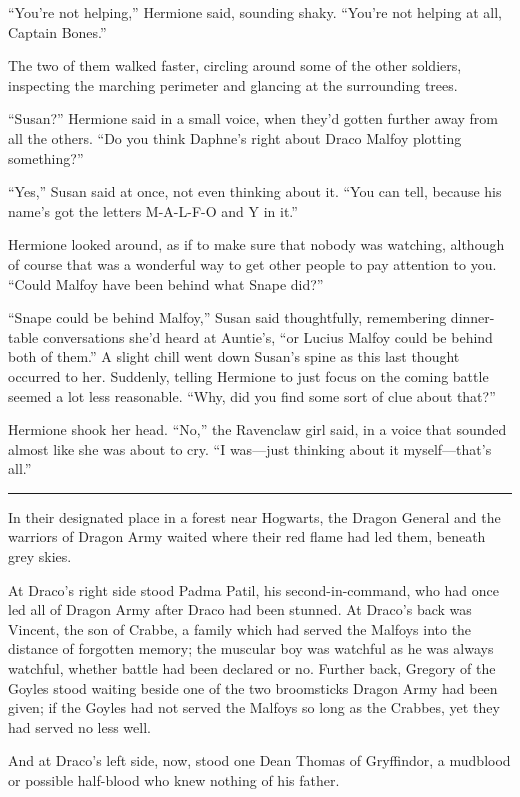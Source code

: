 ``You're not helping,'' Hermione said, sounding shaky. ``You're not
helping at all, Captain Bones.''

The two of them walked faster, circling around some of the other
soldiers, inspecting the marching perimeter and glancing at the
surrounding trees.

``Susan?'' Hermione said in a small voice, when they'd gotten further
away from all the others. ``Do you think Daphne's right about Draco
Malfoy plotting something?''

``Yes,'' Susan said at once, not even thinking about it. ``You can tell,
because his name's got the letters M-A-L-F-O and Y in it.''

Hermione looked around, as if to make sure that nobody was watching,
although of course that was a wonderful way to get other people to pay
attention to you. ``Could Malfoy have been behind what Snape did?''

``Snape could be behind Malfoy,'' Susan said thoughtfully, remembering
dinner-table conversations she'd heard at Auntie's, ``or Lucius Malfoy
could be behind both of them.'' A slight chill went down Susan's spine
as this last thought occurred to her. Suddenly, telling Hermione to just
focus on the coming battle seemed a lot less reasonable. ``Why, did you
find some sort of clue about that?''

Hermione shook her head. ``No,'' the Ravenclaw girl said, in a voice
that sounded almost like she was about to cry. ``I was---just thinking
about it myself---that's all.''

\begin{center}\rule{3in}{0.4pt}\end{center}

In their designated place in a forest near Hogwarts, the Dragon General
and the warriors of Dragon Army waited where their red flame had led
them, beneath grey skies.

At Draco's right side stood Padma Patil, his second-in-command, who had
once led all of Dragon Army after Draco had been stunned. At Draco's
back was Vincent, the son of Crabbe, a family which had served the
Malfoys into the distance of forgotten memory; the muscular boy was
watchful as he was always watchful, whether battle had been declared or
no. Further back, Gregory of the Goyles stood waiting beside one of the
two broomsticks Dragon Army had been given; if the Goyles had not served
the Malfoys so long as the Crabbes, yet they had served no less well.

And at Draco's left side, now, stood one Dean Thomas of Gryffindor, a
mudblood or possible half-blood who knew nothing of his father.

